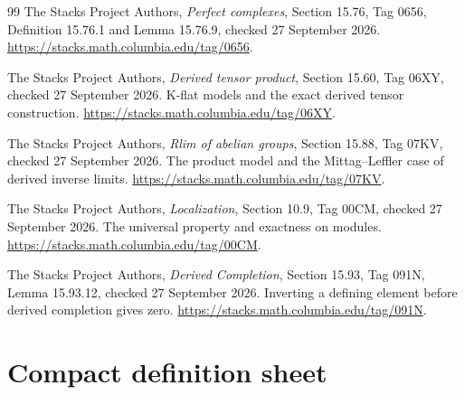 \documentclass[11pt]{article}
\theoremstyle{definition}
\theoremstyle{remark}
\begin{document}
\begin{thebibliography}{99}
The Stacks Project Authors,
\emph{Perfect complexes}, Section 15.76, Tag 0656,
Definition 15.76.1 and Lemma 15.76.9, checked 27 September 2026.
\url{https://stacks.math.columbia.edu/tag/0656}.

The Stacks Project Authors,
\emph{Derived tensor product}, Section 15.60, Tag 06XY,
checked 27 September 2026. K-flat models and the exact derived tensor construction.
\url{https://stacks.math.columbia.edu/tag/06XY}.

The Stacks Project Authors,
\emph{Rlim of abelian groups}, Section 15.88, Tag 07KV,
checked 27 September 2026. The product model and the Mittag--Leffler case of derived inverse limits.
\url{https://stacks.math.columbia.edu/tag/07KV}.

The Stacks Project Authors,
\emph{Localization}, Section 10.9, Tag 00CM,
checked 27 September 2026. The universal property and exactness on modules.
\url{https://stacks.math.columbia.edu/tag/00CM}.

The Stacks Project Authors,
\emph{Derived Completion}, Section 15.93, Tag 091N,
Lemma 15.93.12, checked 27 September 2026. Inverting a defining element before derived completion gives zero.
\url{https://stacks.math.columbia.edu/tag/091N}.

\end{thebibliography}

\appendix
\section{Compact definition sheet}
\end{document}
